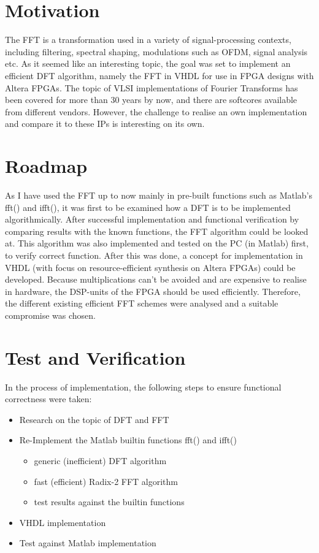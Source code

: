 \chapter{Motivation}
The FFT is a transformation used in a variety of signal-processing contexts, including filtering, spectral shaping, modulations such as OFDM, signal analysis etc. As it seemed like an interesting topic, the goal was set to implement an efficient DFT algorithm, namely the FFT in VHDL for use in FPGA designs with Altera FPGAs.
The topic of VLSI implementations of Fourier Transforms has been covered for more than 30 years by now, and there are softcores available from different vendors. However, the challenge to realise an own implementation and compare it to these IPs is interesting on its own.

\chapter{Roadmap}
As I have used the FFT up to now mainly in pre-built functions such as Matlab's fft() and ifft(), it was first to be examined how a DFT is to be implemented algorithmically. After successful implementation and functional verification by comparing results with the known functions, the FFT algorithm could be looked at. This algorithm was also implemented and tested on the PC (in Matlab) first, to verify correct function. After this was done, a concept for implementation in VHDL (with focus on resource-efficient synthesis on Altera FPGAs) could be developed.
Because multiplications can't be avoided and are expensive to realise in hardware, the DSP-units of the FPGA should be used efficiently. Therefore, the different existing efficient FFT schemes were analysed and a suitable compromise was chosen.

\chapter{Test and Verification}
In the process of implementation, the following steps to ensure functional correctness were taken:

\begin{itemize}
	\item Research on the topic of DFT and FFT
	\item Re-Implement the Matlab builtin functions fft() and ifft()
	\begin{itemize}
		\item generic (inefficient) DFT algorithm
		\item fast (efficient) Radix-2 FFT algorithm
		\item test results against the builtin functions
	\end{itemize}
	\item VHDL implementation
	\item Test against Matlab implementation
\end{itemize}

